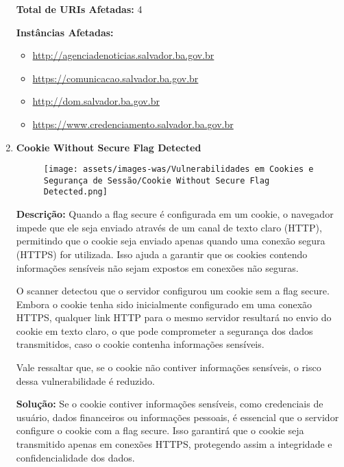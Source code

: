 \documentclass[a4paper,12pt]{article}
\begin{document}
\begin{enumerate}
\textbf{Total de URIs Afetadas:} 4

\textbf{Instâncias Afetadas:}
\begin{itemize}
    \item \url{http://agenciadenoticias.salvador.ba.gov.br}
    \item \url{https://comunicacao.salvador.ba.gov.br}
    \item \url{http://dom.salvador.ba.gov.br}
    \item \url{https://www.credenciamento.salvador.ba.gov.br}
\end{itemize}

\item \textbf{Cookie Without Secure Flag Detected}

                        \begin{figure}[h!]
                        \centering
                        \texttt{[image: assets/images-was/Vulnerabilidades em Cookies e Segurança de Sessão/Cookie Without Secure Flag Detected.png]}
                        \end{figure}
                        \FloatBarrier
                        \textbf{Descrição:} Quando a flag secure é configurada em um cookie, o navegador impede que ele seja enviado através de um canal de texto claro (HTTP), permitindo que o cookie seja enviado apenas quando uma conexão segura (HTTPS) for utilizada. Isso ajuda a garantir que os cookies contendo informações sensíveis não sejam expostos em conexões não seguras.

O scanner detectou que o servidor configurou um cookie sem a flag secure. Embora o cookie tenha sido inicialmente configurado em uma conexão HTTPS, qualquer link HTTP para o mesmo servidor resultará no envio do cookie em texto claro, o que pode comprometer a segurança dos dados transmitidos, caso o cookie contenha informações sensíveis.

Vale ressaltar que, se o cookie não contiver informações sensíveis, o risco dessa vulnerabilidade é reduzido.

\textbf{Solução:} Se o cookie contiver informações sensíveis, como credenciais de usuário, dados financeiros ou informações pessoais, é essencial que o servidor configure o cookie com a flag secure. Isso garantirá que o cookie seja transmitido apenas em conexões HTTPS, protegendo assim a integridade e confidencialidade dos dados.


\end{enumerate}
\end{document}
